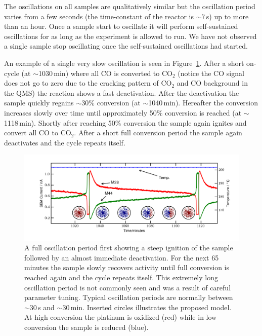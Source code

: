 \documentclass[8.5pt,twoside,twocolumn]{article}
\begin{document}
The oscillations on all samples are qualitatively similar but the oscillation period varies from a few seconds (the time-constant of the reactor is $\sim7\,$s) up to more than an hour. Once a sample start to oscillate it will perform self-sustained oscillations for as long as the experiment is allowed to run. We have not observed a single sample stop oscillating once the self-sustained oscillations had started. 

An example of a single very slow oscillation is seen in Figure~\ref{fgr:full_oscillation}. After a short on-cycle (at $\sim$1030\,min) where all CO is converted to CO$_2$ (notice the CO signal does not go to zero due to the cracking pattern of CO$_2$ and CO background in the QMS) the reaction shows a fast deactivation. After the deactivation the sample quickly regains $\sim$30\% conversion (at $\sim$1040\,min). Hereafter the conversion increases slowly over time until approximately 50\% conversion is reached (at $\sim$1118\,min). Shortly after reaching 50\% conversion the sample again ignites and convert all CO to CO$_2$. After a short full conversion period the sample again deactivates and the cycle repeats itself.
\begin{figure}
  \centering
  \includegraphics[width=17cm]{single_full_oscillation.png}
  \caption{A full oscillation period first showing a steep ignition of the sample followed by an almost immediate deactivation. For the next 65 minutes the sample slowly recovers activity until full conversion is reached again and the cycle repeats itself. This extremely long oscillation period is not commonly seen and was a result of careful parameter tuning. Typical oscillation periods are normally between $\sim$30\,s and $\sim$30\,min. Inserted circles illustrates the proposed model. At high conversion the platinum is oxidized (red) while in low conversion the sample is reduced (blue).}
  \label{fgr:full_oscillation}
\end{figure}
\end{document}
